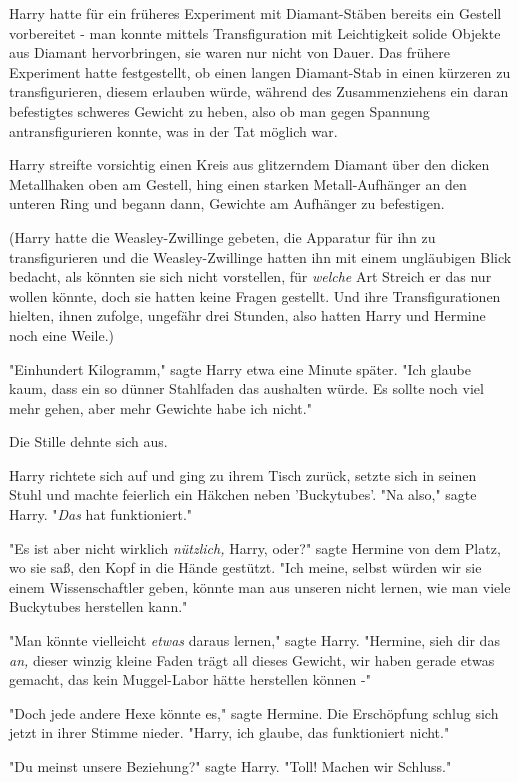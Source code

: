 {Harry hatte für ein früheres Experiment mit Diamant-Stäben bereits ein Gestell vorbereitet - man konnte mittels Transfiguration mit Leichtigkeit solide Objekte aus Diamant hervorbringen, sie waren nur nicht von Dauer. Das frühere Experiment hatte festgestellt, ob einen langen Diamant-Stab in einen kürzeren zu transfigurieren, diesem erlauben würde, während des Zusammenziehens ein daran befestigtes schweres Gewicht zu heben, also ob man gegen Spannung antransfigurieren konnte, was in der Tat möglich war.

Harry streifte vorsichtig einen Kreis aus glitzerndem Diamant über den dicken Metallhaken oben am Gestell, hing einen starken Metall-Aufhänger an den unteren Ring und begann dann, Gewichte am Aufhänger zu befestigen.

(Harry hatte die Weasley-Zwillinge gebeten, die Apparatur für ihn zu transfigurieren und die Weasley-Zwillinge hatten ihn mit einem ungläubigen Blick bedacht, als könnten sie sich nicht vorstellen, für \emph{welche} Art Streich er das nur wollen könnte, doch sie hatten keine Fragen gestellt. Und ihre Transfigurationen hielten, ihnen zufolge, ungefähr drei Stunden, also hatten Harry und Hermine noch eine Weile.)

"Einhundert Kilogramm," sagte Harry etwa eine Minute später. "Ich glaube kaum, dass ein so dünner Stahlfaden das aushalten würde. Es sollte noch viel mehr gehen, aber mehr Gewichte habe ich nicht."

Die Stille dehnte sich aus.

Harry richtete sich auf und ging zu ihrem Tisch zurück, setzte sich in seinen Stuhl und machte feierlich ein Häkchen neben 'Buckytubes'. "Na also," sagte Harry. "\emph{Das} hat funktioniert."

"Es ist aber nicht wirklich \emph{nützlich,} Harry, oder?" sagte Hermine von dem Platz, wo sie saß, den Kopf in die Hände gestützt. "Ich meine, selbst würden wir sie einem Wissenschaftler geben, könnte man aus unseren nicht lernen, wie man viele Buckytubes herstellen kann."

"Man könnte vielleicht \emph{etwas} daraus lernen," sagte Harry. "Hermine, sieh dir das \emph{an,} dieser winzig kleine Faden trägt all dieses Gewicht, wir haben gerade etwas gemacht, das kein Muggel-Labor hätte herstellen können -"

"Doch jede andere Hexe könnte es," sagte Hermine. Die Erschöpfung schlug sich jetzt in ihrer Stimme nieder. "Harry, ich glaube, das funktioniert nicht."

"Du meinst unsere Beziehung?" sagte Harry. "Toll! Machen wir Schluss."

}
